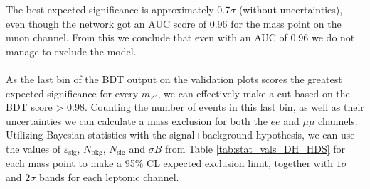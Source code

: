 \documentclass[12pt, a4paper]{book}
\begin{document}
The best expected significance is approximately 0.7$\sigma$ (without uncertainties), even though the network got an AUC score of 0.96 for the mass point on the muon channel. From this we conclude that even with an AUC of 0.96 we do not manage to exclude the model.\\
\\As the last bin of the BDT output on the validation plots scores the greatest expected significance for every $m_{Z'}$, we can effectively make a cut based on the BDT score > 0.98. Counting the number of events in this last bin, as well as their uncertainties we can calculate a mass exclusion for both the $ee$ and $\mu\mu$ channels. 
Utilizing Bayesian statistics with the signal+background hypothesis, we can use the values of $\varepsilon_{\text{sig}}$, $N_{\text{bkg}}$, $N_{\text{sig}}$ and $\sigma B$ from Table \ref{tab:stat_vals_DH_HDS} for each mass point to make a 95\% CL expected exclusion limit, together with $1\sigma$ and $2\sigma$ bands for each leptonic channel. \\
\end{document}
